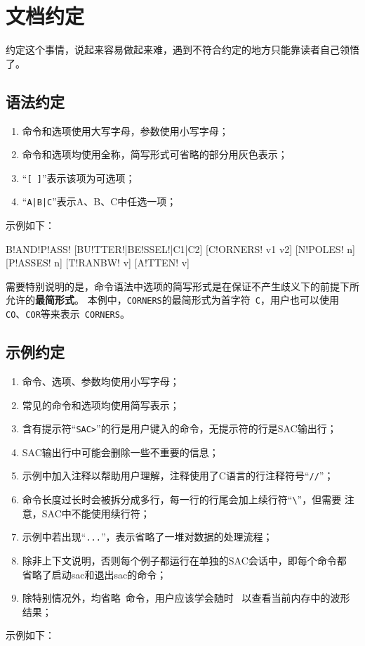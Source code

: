 \section{文档约定}
约定这个事情，说起来容易做起来难，遇到不符合约定的地方只能靠读者自己领悟了。

\subsection*{语法约定}
\begin{enumerate}
\item 命令和选项使用大写字母，参数使用小写字母；
\item 命令和选项均使用全称，简写形式可省略的部分用灰色表示；
\item ``\verb+[ ]+''表示该项为可选项；
\item ``\verb+A|B|C+''表示A、B、C中任选一项；
\end{enumerate}

示例如下：
\begin{SACSTX}
B!AND!P!ASS! [BU!TTER!|BE!SSEL!|C1|C2] [C!ORNERS! v1 v2] [N!POLES! n] [P!ASSES! n]
    [T!RANBW! v] [A!TTEN! v]
\end{SACSTX}

需要特别说明的是，命令语法中选项的简写形式是在保证不产生歧义下的前提下所允许的\textbf{最简形式}。
本例中，\verb+CORNERS+的最简形式为首字符~\verb+C+，用户也可以使用
\verb+CO+、\verb+COR+等来表示~\verb+CORNERS+。

\subsection*{示例约定}
\begin{enumerate}
\item 命令、选项、参数均使用小写字母；
\item 常见的命令和选项均使用简写表示；
\item 含有提示符``\verb+SAC>+''的行是用户键入的命令，无提示符的行是SAC输出行；
\item SAC输出行中可能会删除一些不重要的信息；
\item 示例中加入注释以帮助用户理解，注释使用了C语言的行注释符号``\verb+//+''；
\item 命令长度过长时会被拆分成多行，每一行的行尾会加上续行符``\verb+\+''，但需要
    注意，SAC中不能使用续行符；
\item 示例中若出现``\verb+...+''，表示省略了一堆对数据的处理流程；
\item 除非上下文说明，否则每个例子都运行在单独的SAC会话中，即每个命令都
    省略了启动sac和退出sac的命令；
\item 除特别情况外，均省略~命令，用户应该学会随时~
    以查看当前内存中的波形结果；
\end{enumerate}

示例如下：
